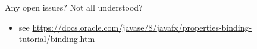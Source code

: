 \frame{\titlepage}




\begin{frame}{Any open issues?}
  Not all understood? 
  \begin{itemize}

  \item see \url{https://docs.oracle.com/javase/8/javafx/properties-binding-tutorial/binding.htm}
  \end{itemize}

\vspace{2\baselineskip}
  \begin{block}{}
  \end{block}
\end{frame}

